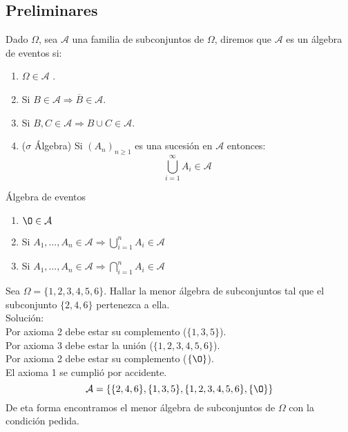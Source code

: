\documentclass[../main.tex]{subfiles}
\begin{document}
\subsection{Preliminares}

\begin{definition}
    Dado $\Omega$, sea $\mathcal{A}$ una familia de subconjuntos de $\Omega$, diremos que $\mathcal{A}$ es un álgebra de eventos si:
    \begin{enumerate}
        \item $\Omega \in \mathcal{A}$ .
        \item Si $B \in \mathcal{A} \Rightarrow \overline{B} \in \mathcal{A}$.
        \item Si $B, C \in \mathcal{A} \Rightarrow B \cup C \in \mathcal{A}$.
        \item ($\sigma$ Álgebra) Si $(A_{n})_{n \geq 1}$ es una sucesión en $\mathcal{A}$ entonces:
            \begin{equation*}
                \bigcup_{i = 1}^{\infty} A_{i} \in \mathcal{A}
            \end{equation*}
    \end{enumerate} 
\end{definition}

\begin{properties} Álgebra de eventos
    \begin{enumerate}
        \item $\O \in \mathcal{A}$
        \item Si $A_{1}, \dots, A_{n} \in \mathcal{A} \Rightarrow \bigcup_{i=1}^{n}A_{i} \in \mathcal{A}$
        \item Si $A_{1}, \dots, A_{n} \in \mathcal{A} \Rightarrow \bigcap_{i=1}^{n}A_{i} \in \mathcal{A}$
    \end{enumerate}
\end{properties}

\begin{defexample}
    Sea $\Omega = \{1, 2, 3, 4, 5, 6\}$. Hallar la menor álgebra de subconjuntos tal que el subconjunto $\{2, 4, 6\}$ pertenezca a ella.\\
    Solución:\\
    Por axioma 2 debe estar su complemento ($\{1, 3, 5\}$).\\
    Por axioma 3 debe estar la unión ($\{1, 2, 3, 4, 5, 6\}$).\\
    Por axioma 2 debe estar su complemento ($\{\O\}$).\\
    El axioma 1 se cumplió por accidente.
    \begin{equation*}
        \mathcal{A} = \{\{2, 4, 6\}, \{1, 3, 5\}, \{1, 2, 3, 4, 5, 6\}, \{\O\}\}
    \end{equation*}
    De eta forma encontramos el menor álgebra de subconjuntos de $\Omega$ con la condición pedida.
\end{defexample}
\end{document}
